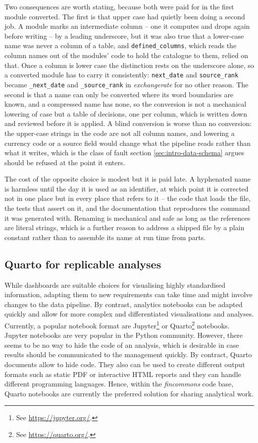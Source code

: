 \documentclass[a4paper, 11pt]{report}
\begin{document}
Two consequences are worth stating, because both were paid for in the first module converted. The first is that upper case had quietly been doing a second job. A module marks an intermediate column -- one it computes and drops again before writing -- by a leading underscore, but it was also true that a lower-case name was never a column of a table, and \verb|defined_columns|, which reads the column names out of the modules' code to hold the catalogue to them, relied on that. Once a column is lower case the distinction rests on the underscore alone, so a converted module has to carry it consistently: \verb|next_date| and \verb|source_rank| became \verb|_next_date| and \verb|_source_rank| in \emph{exchangerate} for no other reason. The second is that a name can only be converted where its word boundaries are known, and a compressed name has none, so the conversion is not a mechanical lowering of case but a table of decisions, one per column, which is written down and reviewed before it is applied. A blind conversion is worse than no conversion: the upper-case strings in the code are not all column names, and lowering a currency code or a source field would change what the pipeline reads rather than what it writes, which is the class of fault section \ref{sec:intro-data-schema} argues should be refused at the point it enters.

The cost of the opposite choice is modest but it is paid late. A hyphenated name is harmless until the day it is used as an identifier, at which point it is corrected not in one place but in every place that refers to it -- the code that loads the file, the tests that assert on it, and the documentation that reproduces the command it was generated with. Renaming is mechanical and safe as long as the references are literal strings, which is a further reason to address a shipped file by a plain constant rather than to assemble its name at run time from parts.


\subsection{Quarto for replicable analyses}

While dashboards are suitable choices for visualising highly standardised information, adapting them to new requirements can take time and might involve changes to the data pipeline. By contrast, analytics notebooks can be adapted quickly and allow for more complex and differentiated visualisations and analyses. Currently, a popular notebook format are Jupyter\footnote{See \url{https://jupyter.org/}.} or Quarto\footnote{See \url{https://quarto.org/}.} notebooks. Jupyter notebooks are very popular in the Python community. However, there seems to be no way to hide the code of an analysis, which is desirable in case results should be communicated to the management quickly. By contract, Quarto documents allow to hide code. They also can be used to create different output formats such as static PDF or interactive HTML reports and they can handle different programming languages. Hence, within the \emph{fincommons} code base, Quarto notebooks are currently the preferred solution for sharing analytical work.
\end{document}
